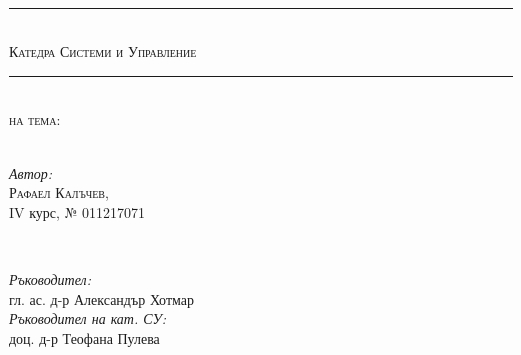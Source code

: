 \begin{titlepage}

	\center %


    \textsc{\LARGE \textbf{\documenttype}}\\[0.2cm] %
	\noindent\rule{16cm}{0.4pt}\\[0.2cm]
	\textsc{\Large Катедра Системи и Управление}\\[0.0cm] %
	\noindent\rule{16cm}{0.4pt}\\[0.5cm]
	\textsc{\large на тема:}\\[0.3cm] %




	{\huge\bfseries \documenttitle }\\[0.3cm] %




	\vspace{0.5cm}

	\begin{minipage}{0.4\textwidth}
		\begin{flushleft}
			\large
			\textit{Автор:}\\
		     \textsc{Рафаел Калъчев}, \\ IV курс, № 011217071\\
		\end{flushleft}
	\end{minipage}
	~
	\begin{minipage}{0.4\textwidth}
		\begin{flushleft}
			\large
			\textit{Ръководител:}\\
			гл. ас. д-р Александър Хотмар \\[1.em]

            \textit{Ръководител на кат. СУ:}\\
            доц. д-р Теофана Пулева \\
		\end{flushleft}
	\end{minipage}


\end{titlepage}
